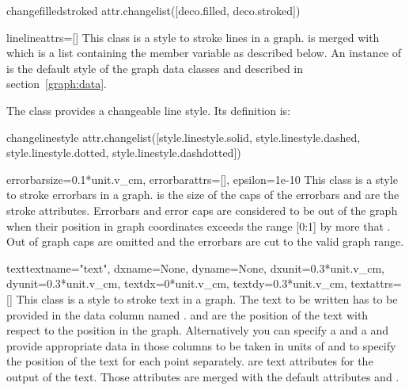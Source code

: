 \begin{memberdesc}{changefilledstroked}
  attr.changelist([deco.filled, deco.stroked])
\end{memberdesc} %

\begin{classdesc}{line}{lineattrs=[]} %
  This class is a style to stroke lines in a graph.
   is merged with  which is
  a list containing the member variable  as
  described below. An instance of  is the default style
  of the graph data classes  and 
  described in section~\ref{graph:data}.
\end{classdesc}

The class  provides a changeable line style. Its
definition is:

\begin{memberdesc}{changelinestyle}
  attr.changelist([style.linestyle.solid, style.linestyle.dashed, style.linestyle.dotted, style.linestyle.dashdotted])
\end{memberdesc} %

\begin{classdesc}{errorbar}{size=0.1*unit.v\_cm, errorbarattrs=[], %
                            epsilon=1e-10}
  This class is a style to stroke errorbars in a graph.  is
  the size of the caps of the errorbars and  are
  the stroke attributes. Errorbars and error caps are considered to be
  out of the graph when their position in graph coordinates exceeds
  the range [0:1] by more that . Out of graph caps are
  omitted and the errorbars are cut to the valid graph range.
\end{classdesc} %

\begin{classdesc}{text}{textname="text", dxname=None, dyname=None, %
                        dxunit=0.3*unit.v\_cm, dyunit=0.3*unit.v\_cm,
                        textdx=0*unit.v\_cm, textdy=0.3*unit.v\_cm,
                        textattrs=[]}
  This class is a style to stroke text in a graph. The
  text to be written has to be provided in the data column named
  .  and  are the position of the
  text with respect to the position in the graph. Alternatively you can
  specify a  and a  and provide appropriate
  data in those columns to be taken in units of  and
   to specify the position of the text for each point
  separately.  are text attributes for the output of
  the text. Those attributes are merged with the default attributes
   and .
\end{classdesc} %

